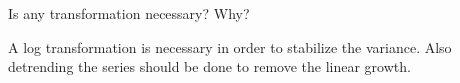 Is any transformation necessary? Why?

\nl A log transformation is necessary in order to stabilize the variance. Also detrending the series should be done to remove the linear growth.